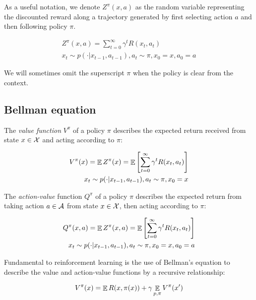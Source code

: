 As a useful notation, we denote $Z^\pi(x, a)$ as the random variable representing the discounted reward along a trajectory generated by first selecting action $a$ and then following policy $\pi$.

\begin{equation}
\begin{split}
Z^\pi(x, a)=\sum_{t=0}^\infty \gamma^tR(x_t,a_t)\\
x_t \sim p(\cdot|x_{t-1}, a_{t-1}), a_t \sim \pi, x_0 = x, a_0 = a
\end{split}
\end{equation}

We will sometimes omit the superscript $\pi$ when the policy is clear from the context.

\subsection{Bellman equation}

The \textit{value function} $V^\pi$ of a policy $\pi$ describes the expected return received from state $x \in \mathcal{X}$ and acting according to $\pi$:

\begin{equation}
\begin{split}
V^\pi(x) = \mathop{\mathbb{E}} Z^\pi(x) = \mathop{\mathbb{E}}\left[\sum_{t=0}^\infty \gamma^tR(x_t,a_t) \right]\\
x_t \sim p(\cdot|x_{t-1}, a_{t-1}), a_t \sim \pi, x_0 = x
\end{split}
\end{equation}


The \textit{action-value} function $Q^\pi$ of a policy $\pi$ describes the expected return from taking action $a \in \mathcal{A}$ from state $x \in \mathcal{X}$, then acting according to $\pi$:

\begin{equation}
\begin{split}
Q^\pi(x, a) = \mathop{\mathbb{E}} Z^\pi(x, a) = \mathop{\mathbb{E}}\left[ \sum_{t=0}^\infty \gamma^tR(x_t,a_t) \right]\\
x_t \sim p(\cdot|x_{t-1}, a_{t-1}), a_t \sim \pi, x_0 = x, a_0 = a
\end{split}
\end{equation}

Fundamental to reinforcement learning is the use of Bellman’s equation \citep{bellman1957markovian} to describe the value and action-value functions by a recursive relationship:

\begin{equation}
V^\pi(x) = \mathop{\mathbb{E}} R(x, \pi(x)) + \gamma \mathop{\mathbb{E}}\limits_{p, \pi}V^\pi(x')
\end{equation}

